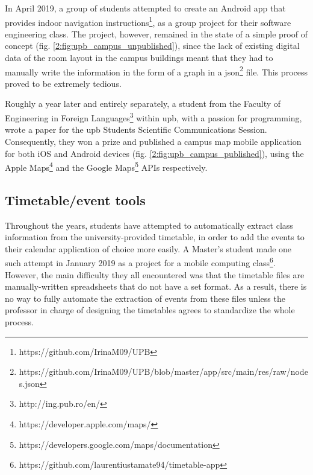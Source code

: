     \clearpage
    
    In April 2019, a group of students attempted to create an Android app that provides indoor navigation instructions\footnote{https://github.com/IrinaM09/UPB}, as a group project for their software engineering class. The project, however, remained in the state of a simple proof of concept (fig. \ref{2:fig:upb_campus_unpublished}), since the lack of existing digital data of the room layout in the campus buildings meant that they had to manually write the information in the form of a graph in a \gls{json}\footnote{https://github.com/IrinaM09/UPB/blob/master/app/src/main/res/raw/nodes.json} file. This process proved to be extremely tedious.
    
    Roughly a year later and entirely separately, a student from the Faculty of Engineering in Foreign Languages\footnote{http://ing.pub.ro/en/} within \acrshort{upb}, with a passion for programming,  wrote a paper for the \acrshort{upb} Students Scientific Communications Session. Consequently, they won a prize and published a campus map mobile application for both iOS and Android devices (fig. \ref{2:fig:upb_campus_published}), using the Apple Maps\footnote{https://developer.apple.com/maps/} and the Google Maps\footnote{https://developers.google.com/maps/documentation} APIs respectively.
    
    \subsection{Timetable/event tools} \label{2:existing_apps_timetable}
    Throughout the years, students have attempted to automatically extract class information from the university-provided timetable, in order to add the events to their calendar application of choice more easily. A Master's student made one such attempt in January 2019 as a project for a mobile computing class\footnote{https://github.com/laurentiustamate94/timetable-app}. However, the main difficulty they all encountered was that the timetable files are manually-written spreadsheets that do not have a set format. As a result, there is no way to fully automate the extraction of events from these files unless the professor in charge of designing the timetables agrees to standardize the whole process.
    
